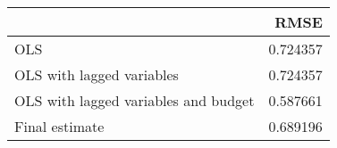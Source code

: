 \begin{tabular}{lr}
\toprule
{} &      RMSE \\
\midrule
OLS                                  &  0.724357 \\
OLS with lagged variables            &  0.724357 \\
OLS with lagged variables and budget &  0.587661 \\
Final estimate                       &  0.689196 \\
\bottomrule
\end{tabular}
